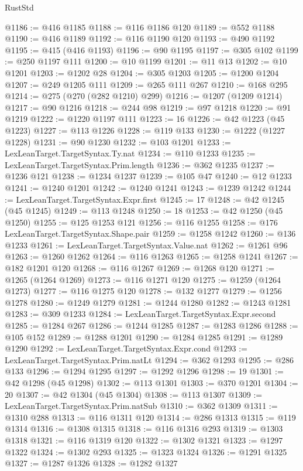 \begin{lexlean}{RustStd}
\begin{coremodule}
@1186 := @416 @1185
@1188 := @116 @1186 @120
@1189 := @552 @1188
@1190 := @416 @1189
@1192 := @116 @1190 @120
@1193 := @490 @1192
@1195 := @415 (@416 @1193)
@1196 := @90 @1195
@1197 := @305 @102
@1199 := @250 @1197 @111
@1200 := @10 @1199
@1201 := @11 @13
@1202 := @10 @1201
@1203 := @1202 @28
@1204 := @305 @1203
@1205 := @1200 @1204
@1207 := @249 @1205 @111
@1209 := @265 @111 @267
@1210 := @168 @295
@1214 := @275 (@270 (@282 @1210) @299)
@1216 := @1207 (@1209 @1214)
@1217 := @90 @1216
@1218 := @244 @98
@1219 := @97 @1218
@1220 := @91 @1219
@1222 := @1220 @1197 @111
@1223 := 16
@1226 := @42 @1223 (@45 @1223)
@1227 := @113 @1226
@1228 := @119 @133
@1230 := @1222 (@1227 @1228)
@1231 := @90 @1230
@1232 := @103 @1201
@1233 := LexLeanTarget.TargetSyntax.Ty.nat
@1234 := @110 @1233
@1235 := LexLeanTarget.TargetSyntax.Prim.length
@1236 := @362 @1235
@1237 := @1236 @121
@1238 := @1234 @1237
@1239 := @105 @47
@1240 := @12 @1233
@1241 := @1240 @1201
@1242 := @1240 @1241
@1243 := @1239 @1242
@1244 := LexLeanTarget.TargetSyntax.Expr.first
@1245 := 17
@1248 := @42 @1245 (@45 @1245)
@1249 := @113 @1248
@1250 := 18
@1253 := @42 @1250 (@45 @1250)
@1255 := @125 @1253 @121
@1256 := @116 @1255
@1258 := @176 LexLeanTarget.TargetSyntax.Shape.pair
@1259 := @1258 @1242
@1260 := @136 @1233
@1261 := LexLeanTarget.TargetSyntax.Value.nat
@1262 := @1261 @96
@1263 := @1260 @1262
@1264 := @116 @1263
@1265 := @1258 @1241
@1267 := @182 @1201 @120
@1268 := @116 @1267
@1269 := @1268 @120
@1271 := @1265 (@1264 @1269)
@1273 := @116 @1271 @120
@1275 := @1259 (@1264 @1273)
@1277 := @116 @1275 @120
@1278 := @132 @1277
@1279 := @1256 @1278
@1280 := @1249 @1279
@1281 := @1244 @1280
@1282 := @1243 @1281
@1283 := @309 @1233
@1284 := LexLeanTarget.TargetSyntax.Expr.second
@1285 := @1284 @267
@1286 := @1244 @1285
@1287 := @1283 @1286
@1288 := @105 @152
@1289 := @1288 @1201
@1290 := @1284 @1285
@1291 := @1289 @1290
@1292 := LexLeanTarget.TargetSyntax.Expr.cond
@1293 := LexLeanTarget.TargetSyntax.Prim.natLt
@1294 := @362 @1293
@1295 := @286 @133
@1296 := @1294 @1295
@1297 := @1292 @1296
@1298 := 19
@1301 := @42 @1298 (@45 @1298)
@1302 := @113 @1301
@1303 := @370 @1201
@1304 := 20
@1307 := @42 @1304 (@45 @1304)
@1308 := @113 @1307
@1309 := LexLeanTarget.TargetSyntax.Prim.natSub
@1310 := @362 @1309
@1311 := @1310 @288
@1313 := @116 @1311 @120
@1314 := @286 @1313
@1315 := @119 @1314
@1316 := @1308 @1315
@1318 := @116 @1316 @293
@1319 := @1303 @1318
@1321 := @116 @1319 @120
@1322 := @1302 @1321
@1323 := @1297 @1322
@1324 := @1302 @293
@1325 := @1323 @1324
@1326 := @1291 @1325
@1327 := @1287 @1326
@1328 := @1282 @1327

\end{coremodule}
\end{lexlean}
